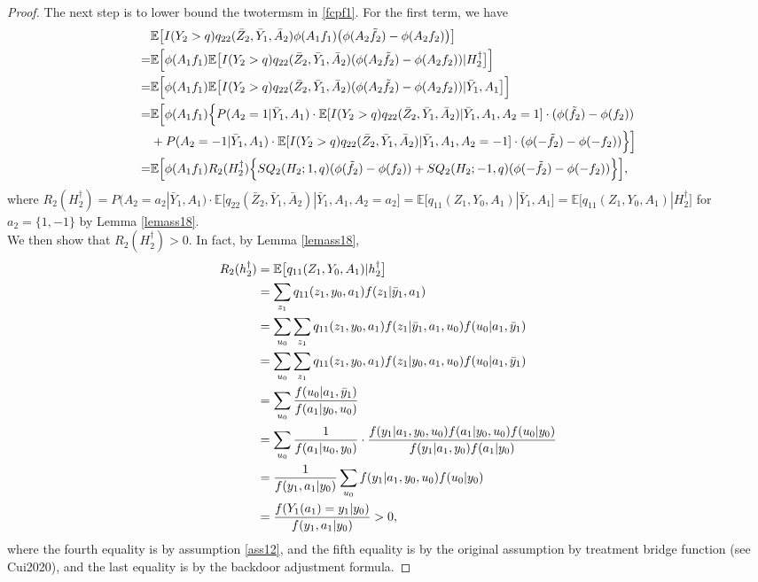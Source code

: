 \documentclass[10pt]{article}
\theoremstyle{remark} \newtheorem{rem}{Remark}
\begin{document}
\begin{proof}
    The next step is to lower bound the twotermsm in \eqref{fcpf1}.
    For the first term, we have
    \begin{align}
        & \mathbb{E} \big[I(Y_2>q)q_{22}(\bar Z_{2}, \bar Y_{1}, \bar A_{2})\phi(A_1f_1)\big(\phi(A_2\tilde f_2)-\phi(A_2f_2)\big)\big] \notag\\
        =& \mathbb{E} \Big[\phi(A_1f_1) \mathbb{E}\big[I(Y_2>q)q_{22}(\bar Z_{2}, \bar Y_{1}, \bar A_{2})(\phi(A_2\tilde f_2)-\phi(A_2f_2))| H_2^\dag \big]\Big] \notag\\
        =& \mathbb{E} \Big[\phi(A_1f_1) \mathbb{E}\big[I(Y_2>q)q_{22}(\bar Z_{2}, \bar Y_{1}, \bar A_{2})(\phi(A_2\tilde f_2)-\phi(A_2f_2))| \bar Y_1, A_1\big]\Big] \notag\\
        =& \mathbb{E} \Big[\phi(A_1f_1)\Big\{P(A_2=1|\bar Y_1,A_1)\cdot\mathbb{E}[I(Y_2>q)q_{22}(\bar Z_{2}, \bar Y_{1}, \bar A_{2})|\bar Y_1,A_1,A_2=1]\cdot (\phi(\tilde f_2)-\phi(f_2)) \notag \\
        &+ P(A_2=-1|\bar Y_1,A_1)\cdot\mathbb{E}[I(Y_2>q)q_{22}(\bar Z_{2}, \bar Y_{1}, \bar A_{2})|\bar Y_1,A_1,A_2=-1]\cdot (\phi(-\tilde f_2)-\phi(-f_2)) \Big\} \Big] \notag\\
        =& \mathbb{E} \Big[\phi(A_1f_1)R_2(H_2^\dag)\Big\{SQ_2(H_2;1,q)(\phi(\tilde f_2)-\phi(f_2)) + SQ_2(H_2;-1,q)(\phi(-\tilde f_2)-\phi(-f_2)) 
        \Big\}\Big],
    \end{align}
    where $R_2(H_2^\dag) = P(A_2=a_2|\bar Y_1,A_1)\cdot \mathbb{E}[q_{22}(\bar Z_{2}, \bar Y_{1}, \bar A_{2})|\bar Y_1,A_1,A_2=a_2]
    =\mathbb{E}\big[q_{11}(Z_1,Y_0,A_1)|\bar Y_1,A_1\big]
    =\mathbb{E}\big[q_{11}(Z_1,Y_0,A_1)|H_2^\dag\big]$ for $a_2=\{1,-1\}$ by Lemma \ref{lemass18}.\\
    We then show that $R_2(H_2^\dag) > 0$. 
    In fact, by Lemma \ref{lemass18},
    \begin{align}
        R_2(h_2^\dag) &= \mathbb{E}\big[q_{11}(Z_1,Y_0,A_1)|h_2^\dag\big] \notag\\
        &= \sum_{z_1}q_{11}(z_1,y_0,a_1)f(z_1|\bar y_1,a_1) \notag\\
        &= \sum_{u_0}\sum_{z_1} q_{11}(z_1,y_0,a_1)f(z_1|\bar y_1,a_1,u_0)f(u_0|a_1,\bar y_1) \notag\\
        &= \sum_{u_0}\sum_{z_1} q_{11}(z_1,y_0,a_1)f(z_1|y_0,a_1,u_0)f(u_0|a_1,\bar y_1) \notag\\
        &= \sum_{u_0}\frac{f(u_0|a_1,\bar y_1)}{f(a_1|y_0, u_0)} \notag\\
        &= \sum_{u_0}\frac{1}{f(a_1|u_0,y_0)}\cdot \frac{f(y_1|a_1,y_0,u_0)f(a_1|y_0,u_0)f(u_0|y_0)}{f(y_1|a_1,y_0)f(a_1|y_0)} \notag\\
        &= \frac{1}{f(y_1,a_1|y_0)}\sum_{u_0}f(y_1|a_1,y_0,u_0)f(u_0|y_0) \notag\\
        &= \frac{f(Y_1(a_1)=y_1|y_0)}{f(y_1,a_1|y_0)} > 0,
    \end{align}
    where the fourth equality is by assumption \ref{ass12}, and the fifth equality is by the original assumption by treatment bridge function (see Cui2020), and the last equality is by the backdoor adjustment formula.


\end{proof}
\end{document}
